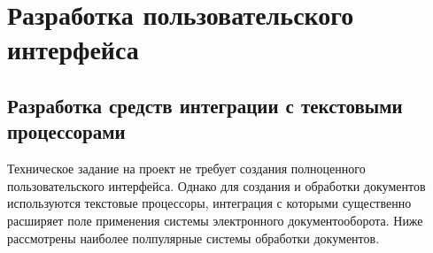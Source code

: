 \section{Разработка пользовательского интерфейса} \label{interface}

\subsection{Разработка средств интеграции с текстовыми процессорами} \label{text_processors}

Техническое задание на проект не требует создания полноценного пользовательского интерфейса.
Однако для создания и обработки документов используются текстовые процессоры, интеграция с которыми существенно расширяет поле применения системы электронного документооборота.
Ниже рассмотрены наиболее полпулярные системы обработки документов.

